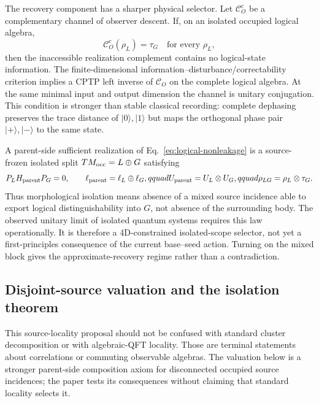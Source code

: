 \documentclass[11pt]{article}
\begin{document}
The recovery component has a sharper physical selector. Let
$\mathcal C_O^c$ be a complementary channel of observer descent. If, on an
isolated occupied logical algebra,
\begin{equation}
 \mathcal C_O^c(\rho_L)=\tau_G
 \quad\text{for every }\rho_L,
 \label{eq:logical-nonleakage}
\end{equation}
then the inaccessible realization complement contains no logical-state
information. The finite-dimensional information--disturbance/correctability
criterion \citep{KnillLaflamme1997} implies
a CPTP left inverse of $\mathcal C_O$ on the complete logical algebra. At the
same minimal input and output dimension the channel is unitary conjugation.
This condition is stronger than stable classical recording: complete
dephasing preserves the trace distance of $|0\rangle,|1\rangle$ but maps the
orthogonal phase pair $|+\rangle,|-\rangle$ to the same state.

A parent-side sufficient realization of Eq.~\eqref{eq:logical-nonleakage} is
a source-frozen isolated split $T M_{\rm occ}=L\oplus G$ satisfying
\begin{equation}
 P_LH_{\rm parent}P_G=0,\qquad
 \ell_{\rm parent}=\ell_L\oplus\ell_G,qquad
 U_{\rm parent}=U_L\otimes U_G,qquad
 \rho_{LG}=\rho_L\otimes\tau_G.
 \label{eq:morphological-isolation}
\end{equation}
Thus morphological isolation means absence of a mixed source incidence able
to export logical distinguishability into $G$, not absence of the surrounding
body. The observed unitary limit of isolated quantum systems requires this
law operationally. It is therefore a 4D-constrained isolated-scope selector,
not yet a first-principles consequence of the current base--seed action.
Turning on the mixed block gives the approximate-recovery regime rather than
a contradiction.

\subsection{Disjoint-source valuation and the isolation theorem}

This source-locality proposal should not be confused with standard cluster
decomposition or with algebraic-QFT locality.  Those are terminal statements
about correlations or commuting observable algebras.  The valuation below is
a stronger parent-side composition axiom for disconnected occupied source
incidences; the paper tests its consequences without claiming that standard
locality selects it.
\end{document}

